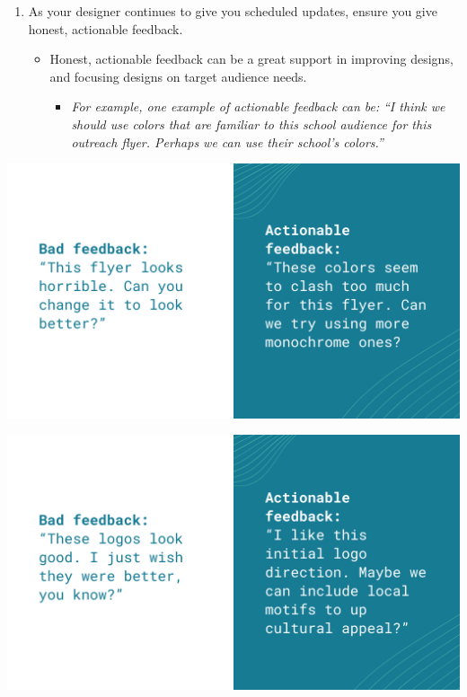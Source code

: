 \documentclass[
]{book}
\providecommand{\tightlist}{%
  \setlength{\itemsep}{0pt}\setlength{\parskip}{0pt}}
\begin{document}
\begin{enumerate}
\def\labelenumi{\arabic{enumi}.}
\tightlist
\item
  As your designer continues to give you scheduled updates, ensure you give honest, actionable feedback.

  \begin{itemize}
  \tightlist
  \item
    Honest, actionable feedback can be a great support in improving designs, and focusing designs on target audience needs.

    \begin{itemize}
    \tightlist
    \item
      \emph{For example, one example of actionable feedback can be:}
      \emph{``I think we should use colors that are familiar to this school audience for this outreach flyer. Perhaps we can use their school's colors.''}
    \end{itemize}
  \end{itemize}
\end{enumerate}

\includegraphics{images/Working-With-Graphic-Designers-Feedback-1.png}

\includegraphics{images/Working-With-Graphic-Designers-Feedback-2.png}
\end{document}
